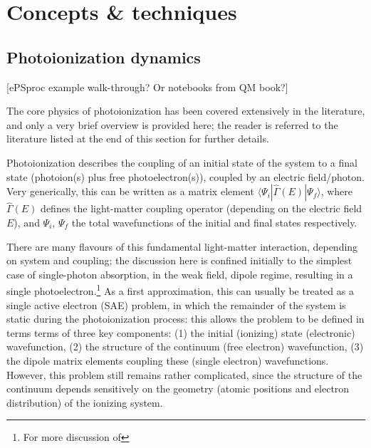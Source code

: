 \section{Concepts \& techniques}

\subsection{Photoionization dynamics} 
[ePSproc example walk-through? Or notebooks from QM book?]

The core physics of photoionization has been covered extensively in the literature, and only a very brief overview is provided here; the reader is referred to the literature listed at the end of this section for further details.

Photoionization describes the coupling of an initial state of the system to a final state (photoion(s) plus free photoelectron(s)), coupled by an electric field/photon. Very generically, this can be written as a matrix element $\langle\Psi_i|\hat{\Gamma}(E)|\Psi_f\rangle$, where $\hat{\Gamma}(E)$ defines the light-matter coupling operator (depending on the electric field $E$), and $\Psi_i$, $\Psi_f$ the total wavefunctions of the initial and final states respectively. 

There are many flavours of this fundamental light-matter interaction, depending on system and coupling; the discussion here is confined initially to the simplest case of single-photon absorption, in the weak field, dipole regime, resulting in a single photoelectron.\footnote{For more discussion of } As a first approximation, this can usually be treated as a single active electron (SAE) problem, in which the remainder of the system is static during the photoionization process: this allows the problem to be defined in terms terms of three key components: (1) the initial (ionizing) state (electronic) wavefunction, (2) the structure of the continuum (free electron) wavefunction, (3) the dipole matrix elements coupling these (single electron) wavefunctions. However, this problem still remains rather complicated, since the structure of the continuum depends sensitively on the geometry (atomic positions and electron distribution) of the ionizing system.